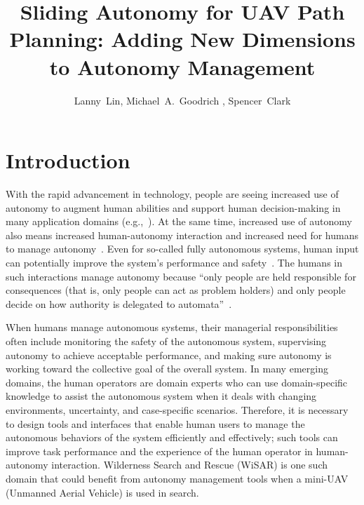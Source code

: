 \documentclass[lettersize, apacite, twoside, HRI]{apa_HRI}
\title{Sliding Autonomy for UAV Path Planning: Adding New Dimensions to Autonomy Management}
\author{Lanny~Lin, Michael~A.~Goodrich
, Spencer~Clark
}
\affiliation{Computer Science Department, Brigham Young University}
\begin{document}
\maketitle

\section{Introduction}
\label{sec:Introduction6}

With the rapid advancement in technology, people are seeing increased use of autonomy to augment human abilities and support human decision-making in many application domains (e.g.,~\cite{Chun2010Limousine,Casper2003Human,Lin2010Supporting,Robins2009From}). At the same time, increased use of autonomy also means increased human-autonomy interaction and increased need for humans to manage autonomy~\cite{Bainbridge1983Ironies}. Even for so-called fully autonomous systems, human input can potentially improve the system's performance and safety~\cite{Bradshaw2013Seven}. The humans in such interactions manage autonomy because ``only people are held responsible for consequences (that is, only people can act as problem holders) and only people decide on how authority is delegated to automata''~\cite{Woods2006Joint}.

When humans manage autonomous systems, their managerial responsibilities often include monitoring the safety of the autonomous system, supervising autonomy to achieve acceptable performance, and making sure autonomy is working toward the collective goal of the overall system. In many emerging domains, the human operators are domain experts who can use domain-specific knowledge to assist the autonomous system when it deals with changing environments, uncertainty, and case-specific scenarios. Therefore, it is necessary to design tools and interfaces that enable human users to manage the autonomous behaviors of the system efficiently and effectively; such tools can improve task performance and the experience of the human operator in human-autonomy interaction. Wilderness Search and Rescue (WiSAR) is one such domain that could benefit from autonomy management tools when a mini-UAV (Unmanned Aerial Vehicle) is used in search.
\end{document}
